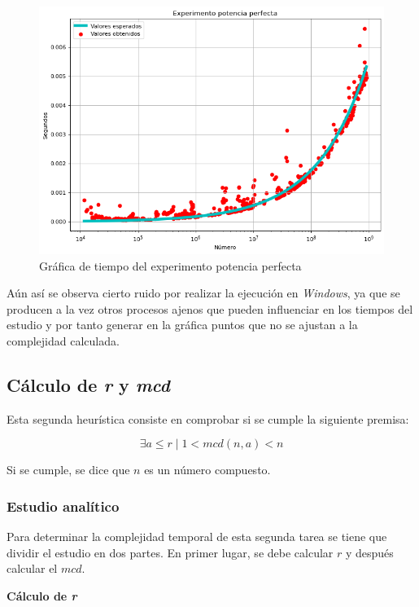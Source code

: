 \documentclass{uc3mpracticas}
\begin{document}
  \begin{figure}[!h]
    \centering
    \includegraphics[width=.8\linewidth]{./Images/h1.png}
    \caption{Gráfica de tiempo del experimento potencia perfecta}
    \label{fig:h1}
  \end{figure}

  Aún así se observa cierto ruido por realizar la ejecución en \textit{Windows}, ya que se producen a la vez otros procesos ajenos que pueden influenciar en los tiempos del estudio y por tanto generar en la gráfica puntos que no se ajustan a la complejidad calculada.




  \subsection{Cálculo de \textit{r} y \textit{mcd}}

  Esta segunda heurística consiste en comprobar si se cumple la siguiente premisa:

  $$ \exists a \leq r \mid 1 < mcd(n,a) < n $$

  Si se cumple, se dice que $n$ es un número compuesto.


  \subsubsection{Estudio analítico}
  Para determinar la complejidad temporal de esta segunda tarea se tiene que dividir el estudio en dos partes. En primer lugar, se debe calcular $r$ y después calcular el $mcd$.

  \vspace{11mm}

  \textbf{Cálculo de \textit{r}}

  \vspace{2mm}
\end{document}
